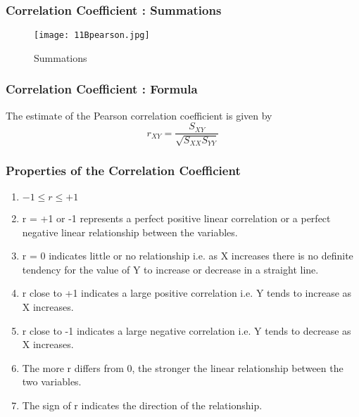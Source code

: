 \documentclass[a4]{beamer}
\begin{document}
\begin{frame}
\frametitle{Correlation Coefficient : Summations}

\begin{figure}
  \texttt{[image: 11Bpearson.jpg]}\\
  \caption{Summations}\label{11bpear}
\end{figure}
\end{frame}
\begin{frame}
\frametitle{Correlation Coefficient : Formula}
The estimate of the Pearson correlation coefficient is given by
\[ r_{XY} = \frac{S_{XY}}{\sqrt{S_{XX}S_{YY}}} \]
\end{frame}
\begin{frame}
\frametitle{Properties of the Correlation Coefficient}
\begin{enumerate}
\item $-1 \leq r \leq +1$
\item r = +1 or -1 represents a perfect positive linear correlation or a perfect negative linear
relationship between the variables.
\item r = 0 indicates little or no relationship i.e. as X increases there is no
definite tendency for the value of Y to increase or decrease in a straight line.
\item r close to +1 indicates a large positive correlation i.e. Y tends to increase
as X increases.
\item r close to -1 indicates a large negative correlation i.e. Y tends to decrease
as X increases.
\item The more r differs from 0, the stronger the linear relationship between the
two variables.
\item The sign of r indicates the direction of the relationship.
\end{enumerate}
\end{frame}
\end{document}

